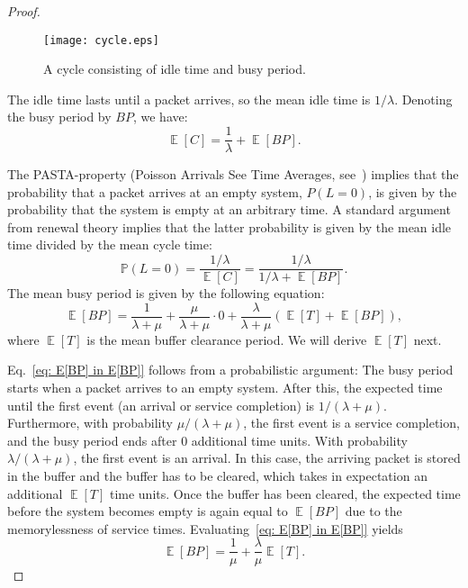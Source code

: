 \documentclass[preprint,12pt]{elsarticle}
\theoremstyle{definition}
\theoremstyle{plain}
\theoremstyle{remark}
\renewcommand{\P}{\ensuremath{\mathbb{P}}}
\DeclareMathOperator{\E}{\mathbb{E}}
\begin{document}
\begin{proof}
\begin{figure}[t]
\begin{center}
  \texttt{[image: cycle.eps]}
\caption{A cycle consisting of idle time and busy period.}
  \label{fig:cycle}
\end{center}
\end{figure}


\smallskip
  The idle time lasts until a packet arrives, so the mean idle time is $1/\lambda$. Denoting the busy period by $BP$, we have:
  \begin{equation*}
    \E[C] = \frac{1}{\lambda} + \E[BP].
  \end{equation*}

  The PASTA-property (Poisson Arrivals See Time Averages, see~\cite{wolff_poisson_1982}) implies that the probability that a packet arrives at an empty system, $P(L=0)$, is given by the probability that the system is empty at an arbitrary time. A standard argument from renewal theory implies that the latter probability is given by the mean idle time divided by the mean cycle time:
  \begin{equation}\label{eq: P(L=0) in E[BP]}
    \P(L=0) = \frac{1/\lambda}{\E[C]} = \frac{1/\lambda}{1/\lambda + \E[BP]}.
  \end{equation}
The mean busy period is given by the following equation:
  \begin{equation}\label{eq: E[BP] in E[BP]}
    \E[BP] = \frac{1}{\lambda+\mu}+\frac{\mu}{\lambda+\mu}\cdot 0+ \frac{\lambda}{\lambda+\mu}\left(\E[T] + \E[BP]\right),
  \end{equation}
  where $\E[T]$ is the mean buffer clearance period. We will derive $\E[T]$ next.

  Eq.~\eqref{eq: E[BP] in E[BP]} follows from a probabilistic argument: The busy period starts when a packet arrives to an empty system. After this, the expected time until the first event (an arrival or service completion) is $1/(\lambda+\mu)$. Furthermore, with probability $\mu/(\lambda+\mu)$, the first event is a service completion, and the busy period ends after 0 additional time units. With probability $\lambda/(\lambda+\mu)$, the first event is an arrival. In this case, the arriving packet is stored in the buffer and the buffer has to be cleared, which takes in expectation an additional $\E[T]$ time units. Once the buffer has been cleared, the expected time before the system becomes empty is again equal to $\E[BP]$ due to the memorylessness of service times. Evaluating~\eqref{eq: E[BP] in E[BP]} yields
  \begin{equation}\label{eq: E[BP] in E[T]}
    \E[BP] = \frac{1}{\mu} + \frac{\lambda}{\mu} \E[T].
  \end{equation}


\end{proof}
\end{document}
